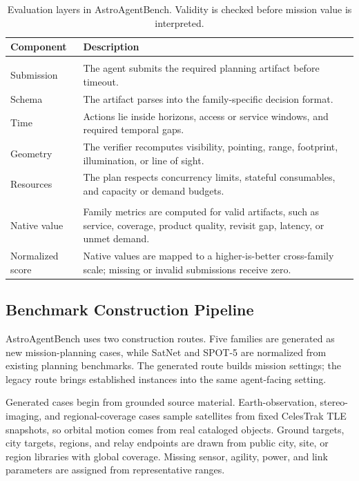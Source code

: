 \documentclass[]{mosi}
\begin{document}
\begin{table}[t]
\centering
\small
\setlength{\tabcolsep}{5pt}
\begin{tabular}{>{\raggedright\arraybackslash}p{}>{\raggedright\arraybackslash}p{}}
\hline
\textbf{Component} & \textbf{Description} \\
\hline
\multicolumn{2}{c}{\cellcolor{gray!18}\textit{Validity}} \\
Submission & The agent submits the required planning artifact before timeout. \\
Schema & The artifact parses into the family-specific decision format. \\
Time & Actions lie inside horizons, access or service windows, and required temporal gaps. \\
Geometry & The verifier recomputes visibility, pointing, range, footprint, illumination, or line of sight. \\
Resources & The plan respects concurrency limits, stateful consumables, and capacity or demand budgets. \\
\hline
\multicolumn{2}{c}{\cellcolor{gray!18}\textit{Performance}} \\
Native value & Family metrics are computed for valid artifacts, such as service, coverage, product quality, revisit gap, latency, or unmet demand. \\
Normalized score & Native values are mapped to a higher-is-better cross-family scale; missing or invalid submissions receive zero. \\
\hline
\end{tabular}
\caption{Evaluation layers in AstroAgentBench. Validity is checked before mission value is interpreted.}
\label{tab:evaluation-layers}
\end{table}

\subsection{Benchmark Construction Pipeline}
\label{sec:construction-pipeline}

AstroAgentBench uses two construction routes. Five families are generated as new mission-planning cases, while SatNet and SPOT-5 are normalized from existing planning benchmarks. The generated route builds mission settings; the legacy route brings established instances into the same agent-facing setting.

Generated cases begin from grounded source material. Earth-observation, stereo-imaging, and regional-coverage cases sample satellites from fixed CelesTrak TLE snapshots, so orbital motion comes from real cataloged objects. Ground targets, city targets, regions, and relay endpoints are drawn from public city, site, or region libraries with global coverage. Missing sensor, agility, power, and link parameters are assigned from representative ranges.
\end{document}
